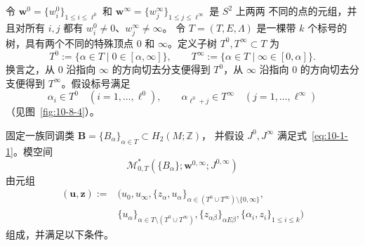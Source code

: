 令 $\mathbf w^0=\{w_i^0\}_{1\leq i\leq\ell^0}$ 和
$\mathbf w^\infty=\{w_j^\infty\}_{1\leq j\leq\ell^\infty}$ 是 $S^2$ 上两两
不同的点的元组，并且对所有 $i,j$ 都有 $w_i^0\ne0$、$w_j^\infty\ne\infty$。
令 $T=(T,E,\Lambda)$ 是一棵带 $k$ 个标号的树，具有两个不同的特殊顶点
$0$ 和 $\infty$。定义子树 $T^0,T^\infty\subset T$ 为
\[
  T^0:=\{\alpha\in T\mid0\in[\alpha,\infty]\},
  \qquad
  T^\infty:=\{\alpha\in T\mid\infty\in[0,\alpha]\}.
\]
换言之，从 $0$ 沿指向 $\infty$ 的方向切去分支便得到 $T^0$，从 $\infty$ 沿指向
$0$ 的方向切去分支便得到 $T^\infty$。假设标号满足
\[
  \alpha_i\in T^0\quad(i=1,\ldots,\ell^0),
  \qquad
  \alpha_{\ell^0+j}\in T^\infty\quad(j=1,\ldots,\ell^\infty)
\]
（见图~\ref{fig:10-8-4}）。

固定一族同调类 $\mathbf B=\{B_\alpha\}_{\alpha\in T}\subset H_2(M;\mathbb Z)$，
并假设 $J^0,J^\infty$ 满足式~\eqref{eq:10-1-1}。模空间
\[
  \mathcal M_{0,T}^*(\{B_\alpha\};\mathbf w^{0,\infty};J^{0,\infty})
\]
由元组
\[
\begin{split}
  (\mathbf u,\mathbf z):={}&
  \bigl(u_0,u_\infty,
  \{z_\alpha,u_\alpha\}_{\alpha\in(T^0\cup T^\infty)\setminus\{0,\infty\}},\\
  &\{u_\alpha\}_{\alpha\in T\setminus(T^0\cup T^\infty)},
  \{z_{\alpha\beta}\}_{\alpha E\beta},
  \{\alpha_i,z_i\}_{1\leq i\leq k}\bigr)
\end{split}
\]
组成，并满足以下条件。

